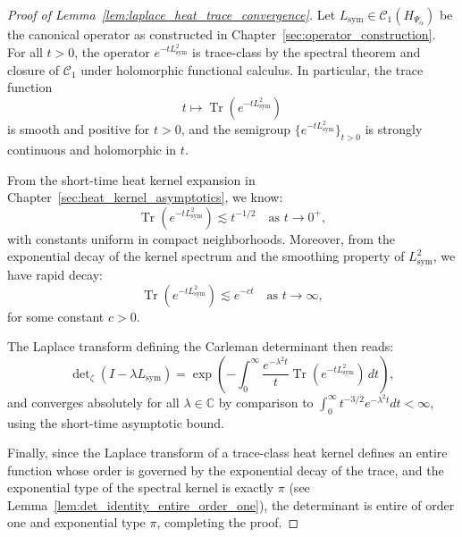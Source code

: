 \begin{proof}[Proof of Lemma~\ref{lem:laplace_heat_trace_convergence}]
Let \( L_{\mathrm{sym}} \in \mathcal{C}_1(H_{\Psi_\alpha}) \) be the canonical operator as constructed in Chapter~\ref{sec:operator_construction}. For all \( t > 0 \), the operator \( e^{-t L_{\mathrm{sym}}^2} \) is trace-class by the spectral theorem and closure of \( \mathcal{C}_1 \) under holomorphic functional calculus. In particular, the trace function
\[
t \mapsto \operatorname{Tr}(e^{-t L_{\mathrm{sym}}^2})
\]
is smooth and positive for \( t > 0 \), and the semigroup \( \{ e^{-t L_{\mathrm{sym}}^2} \}_{t>0} \) is strongly continuous and holomorphic in \( t \).

\smallskip
\noindent
From the short-time heat kernel expansion in Chapter~\ref{sec:heat_kernel_asymptotics}, we know:
\[
\operatorname{Tr}(e^{-t L_{\mathrm{sym}}^2}) \lesssim t^{-1/2} \quad \text{as } t \to 0^+,
\]
with constants uniform in compact neighborhoods. Moreover, from the exponential decay of the kernel spectrum and the smoothing property of \( L_{\mathrm{sym}}^2 \), we have rapid decay:
\[
\operatorname{Tr}(e^{-t L_{\mathrm{sym}}^2}) \lesssim e^{-ct} \quad \text{as } t \to \infty,
\]
for some constant \( c > 0 \).

\smallskip
\noindent
The Laplace transform defining the Carleman determinant then reads:
\[
\det\nolimits_\zeta(I - \lambda L_{\mathrm{sym}}) = \exp\left(- \int_0^\infty \frac{e^{-\lambda^2 t}}{t} \operatorname{Tr}(e^{-t L_{\mathrm{sym}}^2}) \, dt \right),
\]
and converges absolutely for all \( \lambda \in \mathbb{C} \) by comparison to \( \int_0^\infty t^{-3/2} e^{-\lambda^2 t} dt < \infty \), using the short-time asymptotic bound.

\smallskip
\noindent
Finally, since the Laplace transform of a trace-class heat kernel defines an entire function whose order is governed by the exponential decay of the trace, and the exponential type of the spectral kernel is exactly \( \pi \) (see Lemma~\ref{lem:det_identity_entire_order_one}), the determinant is entire of order one and exponential type \( \pi \), completing the proof.
\end{proof}
%  